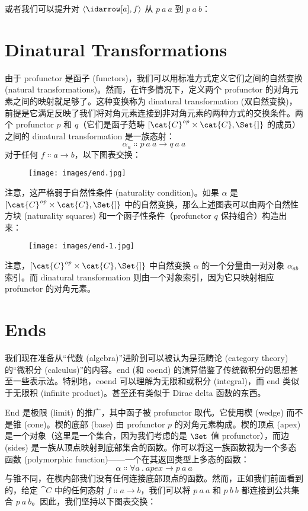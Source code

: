或者我们可以提升对 $\langle \idarrow[a], f \rangle$ 从 $p\ a\ a$ 到 $p\ a\ b$：


\section{Dinatural Transformations}

由于 profunctor 是函子 (functors)，我们可以用标准方式定义它们之间的自然变换 (natural transformations)。然而，在许多情况下，定义两个 profunctor 的对角元素之间的映射就足够了。这种变换称为 dinatural transformation (双自然变换)，前提是它满足反映了我们将对角元素连接到非对角元素的两种方式的交换条件。两个 profunctor $p$ 和 $q$（它们是函子范畴 ${[}\cat{C}^\mathit{op}\times{}\cat{C}, \Set{]}$ 的成员）之间的 dinatural transformation 是一族态射：
\[\alpha_a \Colon p\ a\ a \to q\ a\ a\]
对于任何 $f \Colon a \to b$，以下图表交换：

\begin{figure}[H]
  \centering
  \texttt{[image: images/end.jpg]}
\end{figure}

\noindent
注意，这严格弱于自然性条件 (naturality condition)。如果 $\alpha$ 是 ${[}\cat{C}^\mathit{op}\times{}\cat{C}, \Set{]}$ 中的自然变换，那么上述图表可以由两个自然性方块 (naturality squares) 和一个函子性条件（profunctor $q$ 保持组合）构造出来：

\begin{figure}[H]
  \centering
  \texttt{[image: images/end-1.jpg]}
\end{figure}

\noindent
注意，${[}\cat{C}^\mathit{op}\times{}\cat{C}, \Set{]}$ 中自然变换 $\alpha$ 的一个分量由一对对象 $\alpha_{a b}$ 索引。而 dinatural transformation 则由一个对象索引，因为它只映射相应 profunctor 的对角元素。

\section{Ends}

我们现在准备从“代数 (algebra)”进阶到可以被认为是范畴论 (category theory) 的“微积分 (calculus)”的内容。end (和 coend) 的演算借鉴了传统微积分的思想甚至一些表示法。特别地，coend 可以理解为无限和或积分 (integral)，而 end 类似于无限积 (infinite product)。甚至还有类似于 Dirac delta 函数的东西。

End 是极限 (limit) 的推广，其中函子被 profunctor 取代。它使用楔 (wedge) 而不是锥 (cone)。楔的底部 (base) 由 profunctor $p$ 的对角元素构成。楔的顶点 (apex) 是一个对象（这里是一个集合，因为我们考虑的是 $\Set$ 值 profunctor），而边 (sides) 是一族从顶点映射到底部集合的函数。你可以将这一族函数视为一个多态函数 (polymorphic function)——一个在其返回类型上多态的函数：
\[\alpha \Colon \forall a\ .\ \mathit{apex} \to p\ a\ a\]
与锥不同，在楔内部我们没有任何连接底部顶点的函数。然而，正如我们前面看到的，给定 $\cat{C}$ 中的任何态射 $f \Colon a \to b$，我们可以将 $p\ a\ a$ 和 $p\ b\ b$ 都连接到公共集合 $p\ a\ b$。因此，我们坚持以下图表交换：

